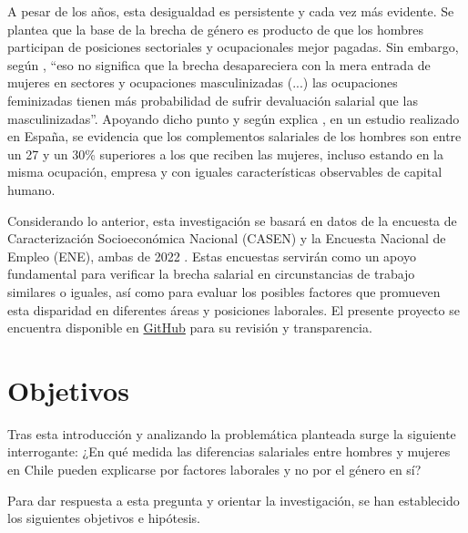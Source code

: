
A pesar de los años, esta desigualdad es persistente y cada vez más evidente. Se plantea que la base de la brecha de género es producto de que los hombres participan de posiciones sectoriales y ocupacionales mejor pagadas. Sin embargo, según \citet[pp. 333]{Ibanez2022}, ``eso no significa que la brecha desapareciera con la mera entrada de mujeres en sectores y ocupaciones masculinizadas (...) las ocupaciones feminizadas tienen más probabilidad de sufrir devaluación salarial que las masculinizadas''. Apoyando dicho punto y según explica \citet{Villar2010}, en un estudio realizado en España, se evidencia que los complementos salariales de los hombres son entre un 27 y un 30\% superiores a los que reciben las mujeres, incluso estando en la misma ocupación, empresa y con iguales características observables de capital humano.

Considerando lo anterior, esta investigación se basará en datos de la encuesta de Caracterización Socioeconómica Nacional (CASEN) y la Encuesta Nacional de Empleo (ENE), ambas de 2022 \citep{CASEN2022, ENE2022}. Estas encuestas servirán como un apoyo fundamental para verificar la brecha salarial en circunstancias de trabajo similares o iguales, así como para evaluar los posibles factores que promueven esta disparidad en diferentes áreas y posiciones laborales. El presente proyecto se encuentra disponible en \href{https://github.com/ElK1000o/Taller-Ciencia-de-Datos-II/tree/main/Proyecto}{GitHub} para su revisión y transparencia.

\section{Objetivos}


Tras esta introducción y analizando la problemática planteada surge la siguiente interrogante: ¿En qué medida las diferencias salariales entre hombres y mujeres en Chile pueden explicarse por factores laborales y no por el género en sí?

Para dar respuesta a esta pregunta y orientar la investigación, se han establecido los siguientes objetivos e hipótesis.

